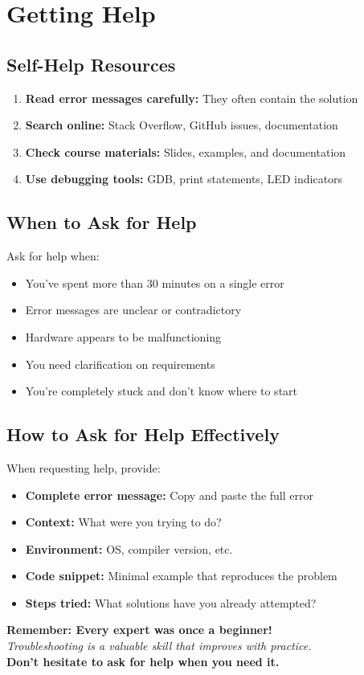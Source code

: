 \documentclass[11pt,a4paper]{article}
\begin{document}
\section{Getting Help}

\subsection{Self-Help Resources}

\begin{enumerate}
    \item \textbf{Read error messages carefully:} They often contain the solution
    \item \textbf{Search online:} Stack Overflow, GitHub issues, documentation
    \item \textbf{Check course materials:} Slides, examples, and documentation
    \item \textbf{Use debugging tools:} GDB, print statements, LED indicators
\end{enumerate}

\subsection{When to Ask for Help}

Ask for help when:
\begin{itemize}
    \item You've spent more than 30 minutes on a single error
    \item Error messages are unclear or contradictory
    \item Hardware appears to be malfunctioning
    \item You need clarification on requirements
    \item You're completely stuck and don't know where to start
\end{itemize}

\subsection{How to Ask for Help Effectively}

When requesting help, provide:
\begin{itemize}
    \item \textbf{Complete error message:} Copy and paste the full error
    \item \textbf{Context:} What were you trying to do?
    \item \textbf{Environment:} OS, compiler version, etc.
    \item \textbf{Code snippet:} Minimal example that reproduces the problem
    \item \textbf{Steps tried:} What solutions have you already attempted?
\end{itemize}

\vspace{1cm}

\begin{center}
\textbf{Remember: Every expert was once a beginner!}\\
\textit{Troubleshooting is a valuable skill that improves with practice.}\\
\textbf{Don't hesitate to ask for help when you need it.}
\end{center}
\end{document}
